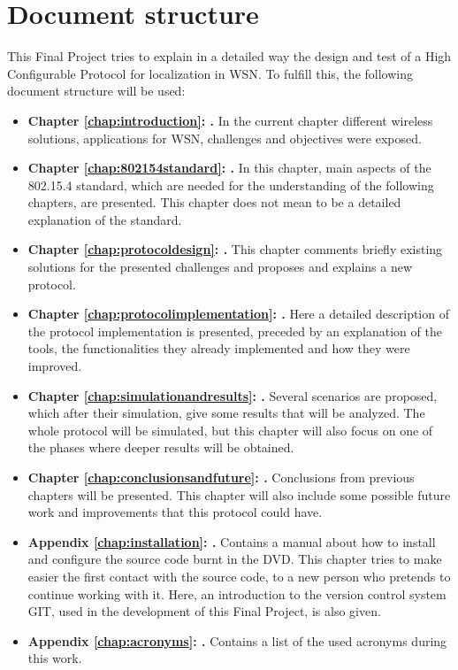 \section{Document structure}

This Final Project tries to explain in a detailed way the design and test of a High Configurable Protocol for localization in \ac{WSN}. To 
fulfill this, the following document structure will be used:

\begin{itemize}
 \item \textbf{Chapter \ref{chap:introduction}: .} In the current chapter different wireless solutions, applications
for \ac{WSN}, challenges and objectives were exposed.
 \item \textbf{Chapter \ref{chap:802154standard}: .} In this chapter, main aspects of the 802.15.4 standard, which
are needed for the understanding of the following chapters, are presented. This chapter does not mean to be a detailed explanation of the 
standard.
 \item \textbf{Chapter \ref{chap:protocoldesign}: .} This chapter comments briefly existing solutions for the
presented challenges and proposes and explains a new protocol.
 \item \textbf{Chapter \ref{chap:protocolimplementation}: .} Here a detailed description of the protocol 
implementation is presented, preceded by an explanation of the tools, the functionalities they already implemented and how they were
improved.
 \item \textbf{Chapter \ref{chap:simulationandresults}: .} Several scenarios are proposed, which after their
simulation, give some results that will be analyzed. The whole protocol will be simulated, but this chapter will also focus on one of the 
phases where deeper results will be obtained.
 \item \textbf{Chapter \ref{chap:conclusionsandfuture}: .} Conclusions from previous chapters will be 
presented. This chapter will also include some possible future work and improvements that this protocol could have.
 \item \textbf{Appendix \ref{chap:installation}: .} Contains a manual about how to install and configure 
the source code burnt in the \ac{DVD}. This chapter tries to make easier the first contact with the source code, to a new person who pretends
to continue working with it. Here, an introduction to the version control system GIT, used in the development of this Final Project, is also 
given.
 \item \textbf{Appendix \ref{chap:acronyms}: .} Contains a list of the used acronyms during this work.
\end{itemize}


